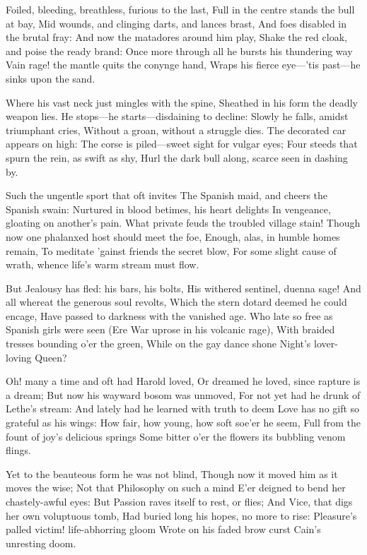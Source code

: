 \documentclass[10pt,twocolumn]{book}
\begin{document}
   Foiled, bleeding, breathless, furious to the last,
   Full in the centre stands the bull at bay,
   Mid wounds, and clinging darts, and lances brast,
   And foes disabled in the brutal fray:
   And now the matadores around him play,
   Shake the red cloak, and poise the ready brand:
   Once more through all he bursts his thundering way\textemdash
   Vain rage! the mantle quits the conynge hand,
Wraps his fierce eye---'tis past---he sinks upon the sand.


   Where his vast neck just mingles with the spine,
   Sheathed in his form the deadly weapon lies.
   He stops---he starts---disdaining to decline:
   Slowly he falls, amidst triumphant cries,
   Without a groan, without a struggle dies.
   The decorated car appears on high:
   The corse is piled---sweet sight for vulgar eyes;
   Four steeds that spurn the rein, as swift as shy,
Hurl the dark bull along, scarce seen in dashing by.


   Such the ungentle sport that oft invites
   The Spanish maid, and cheers the Spanish swain:
   Nurtured in blood betimes, his heart delights
   In vengeance, gloating on another's pain.
   What private feuds the troubled village stain!
   Though now one phalanxed host should meet the foe,
   Enough, alas, in humble homes remain,
   To meditate 'gainst friends the secret blow,
For some slight cause of wrath, whence life's warm stream must flow.


   But Jealousy has fled:  his bars, his bolts,
   His withered sentinel, duenna sage!
   And all whereat the generous soul revolts,
   Which the stern dotard deemed he could encage,
   Have passed to darkness with the vanished age.
   Who late so free as Spanish girls were seen
   (Ere War uprose in his volcanic rage),
   With braided tresses bounding o'er the green,
While on the gay dance shone Night's lover-loving Queen?


   Oh! many a time and oft had Harold loved,
   Or dreamed he loved, since rapture is a dream;
   But now his wayward bosom was unmoved,
   For not yet had he drunk of Lethe's stream:
   And lately had he learned with truth to deem
   Love has no gift so grateful as his wings:
   How fair, how young, how soft soe'er he seem,
   Full from the fount of joy's delicious springs
Some bitter o'er the flowers its bubbling venom flings.


   Yet to the beauteous form he was not blind,
   Though now it moved him as it moves the wise;
   Not that Philosophy on such a mind
   E'er deigned to bend her chastely-awful eyes:
   But Passion raves itself to rest, or flies;
   And Vice, that digs her own voluptuous tomb,
   Had buried long his hopes, no more to rise:
   Pleasure's palled victim! life-abhorring gloom
Wrote on his faded brow curst Cain's unresting doom.
\end{document}
